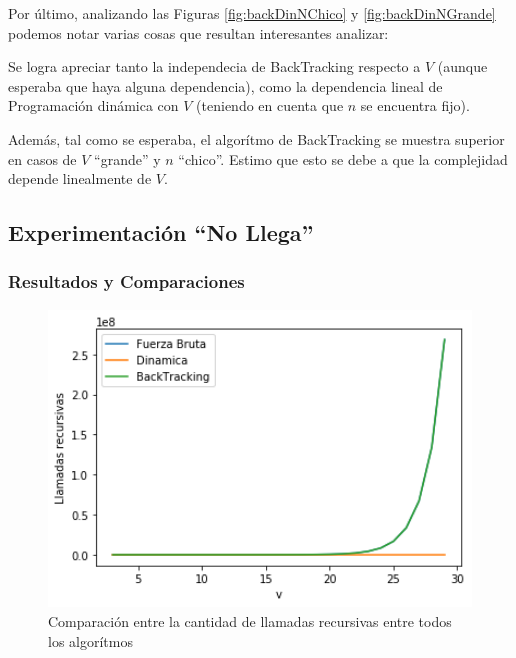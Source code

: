 \par Por \'ultimo, analizando las Figuras \ref{fig:backDinNChico} y \ref{fig:backDinNGrande} podemos notar varias cosas que 
resultan interesantes analizar:
\par Se logra apreciar tanto la independecia de BackTracking respecto a $V$ 
(aunque esperaba que haya alguna dependencia), como la dependencia lineal de Programaci\'on din\'amica con $V$ (teniendo
en cuenta que $n$ se encuentra fijo).
\par Adem\'as, tal como se esperaba, el algor\'itmo de BackTracking se muestra superior en casos de $V$ ``grande'' y 
$n$ ``chico''.
Estimo que esto se debe a que la complejidad depende linealmente de $V$.


\subsection{Experimentaci\'on ``No Llega''}
\subsubsection{Resultados y Comparaciones}

\begin{figure}[H] 
    \centering
    \begin{minipage}{0.45\textwidth}
        \centering
        \includegraphics[width=1\textwidth]{img/nollega/todosllamadas.png} %
        \caption{Comparaci\'on entre la cantidad de llamadas recursivas entre todos los algor\'itmos}
        \label{fig:todosllamadasnollega} 
    \end{minipage}\hfill
\end{figure}


